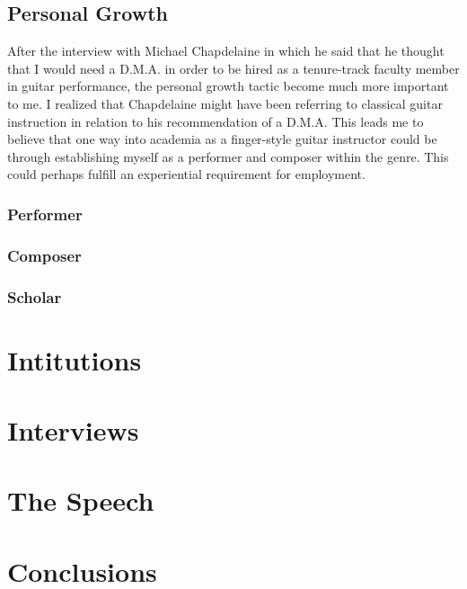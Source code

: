 \documentclass[12pt]{article}
\begin{document}
\subsection{Personal Growth}
\label{sec:personal-growth}
After the interview with Michael Chapdelaine in which he said that he
thought that I would need a D.M.A. in order to be hired as a
tenure-track faculty member in guitar performance, the personal growth
tactic become much more important to me. I realized that Chapdelaine
might have been referring to classical guitar instruction in relation
to his recommendation of a D.M.A. This leads me to believe that one
way into academia as a finger-style guitar instructor could be through
establishing myself as a performer and composer within the genre. This
could perhaps fulfill an experiential requirement for employment.
\subsubsection{Performer}
\label{sec:performer}

\subsubsection{Composer}
\label{sec:composer}

\subsubsection{Scholar}
\label{sec:scholar}


\section{Intitutions}
\label{sec:intitutions}

\section{Interviews}
\label{sec:interviews}

\section{The Speech}
\label{sec:speech}

\section{Conclusions}
\label{sec:conclusions}
\end{document}
